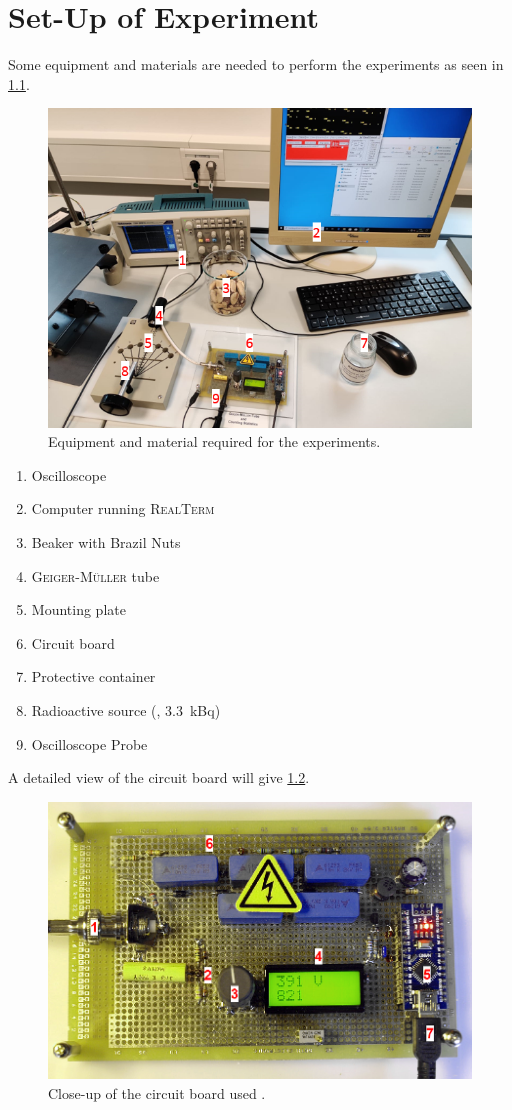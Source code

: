 \chapter{Set-Up of Experiment}
%
Some equipment and materials are needed to perform the experiments as seen in \cref{fig:setup}.
%
\begin{figure}[h]
	\centering
	\includegraphics[width=.9\textwidth]{aufbau/setup.PNG} %
	\caption[Equipment used.]{Equipment and material required for the experiments.}
	\label{fig:setup} 
\end{figure}
%
\begin{enumerate}
	\item Oscilloscope
	\item Computer running \textsc{RealTerm}
	\item Beaker with Brazil Nuts
	\item \textsc{Geiger-Müller} tube
	\item Mounting plate
	\item Circuit board
	\item Protective container
	\item Radioactive source (, \SI[]{3.3}[]{kBq})
	\item Oscilloscope Probe
\end{enumerate}\par\medskip
%
A detailed view of the circuit board will give \cref{fig:circuit_board}.
%
\begin{figure}[H]
	\includegraphics[width=.9\textwidth]{aufbau/circuit_board.png}
	\caption[Close-up of the electronics]{Close-up of the circuit board used \cite[]{AlexanderDorr.GMT}.}
	\label{fig:circuit_board}
\end{figure}
